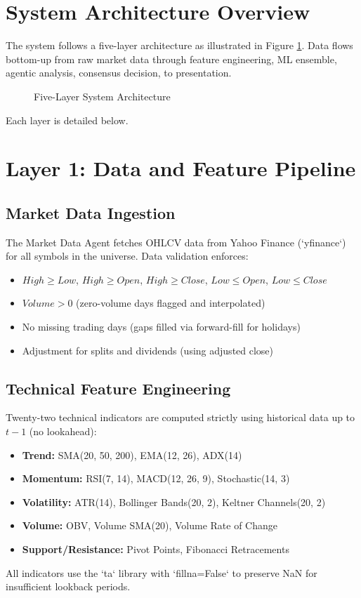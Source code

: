 \documentclass[12pt,a4paper]{report}
\begin{document}
\section{System Architecture Overview}
The system follows a five-layer architecture as illustrated in Figure \ref{fig:architecture}. Data flows bottom-up from raw market data through feature engineering, ML ensemble, agentic analysis, consensus decision, to presentation.

\begin{figure}[H]
    \centering
    \caption{Five-Layer System Architecture}
    \label{fig:architecture}
\end{figure}

Each layer is detailed below.

\section{Layer 1: Data and Feature Pipeline}
\subsection{Market Data Ingestion}
The Market Data Agent fetches OHLCV data from Yahoo Finance (`yfinance`) for all symbols in the universe. Data validation enforces:
\begin{itemize}
    \item $High \ge Low$, $High \ge Open$, $High \ge Close$, $Low \le Open$, $Low \le Close$
    \item $Volume > 0$ (zero-volume days flagged and interpolated)
    \item No missing trading days (gaps filled via forward-fill for holidays)
    \item Adjustment for splits and dividends (using adjusted close)
\end{itemize}

\subsection{Technical Feature Engineering}
Twenty-two technical indicators are computed strictly using historical data up to $t-1$ (no lookahead):
\begin{itemize}
    \item \textbf{Trend:} SMA(20, 50, 200), EMA(12, 26), ADX(14)
    \item \textbf{Momentum:} RSI(7, 14), MACD(12, 26, 9), Stochastic(14, 3)
    \item \textbf{Volatility:} ATR(14), Bollinger Bands(20, 2), Keltner Channels(20, 2)
    \item \textbf{Volume:} OBV, Volume SMA(20), Volume Rate of Change
    \item \textbf{Support/Resistance:} Pivot Points, Fibonacci Retracements
\end{itemize}
All indicators use the `ta` library with `fillna=False` to preserve NaN for insufficient lookback periods.
\end{document}

